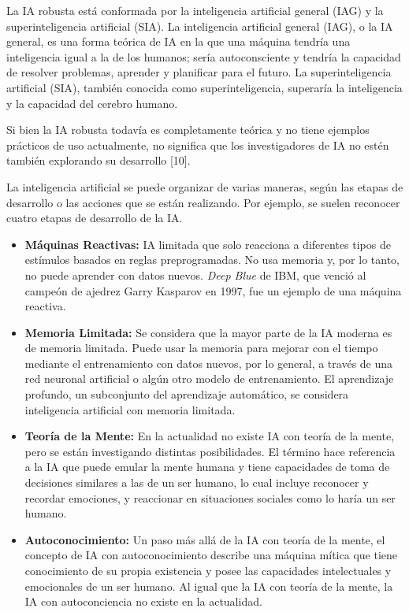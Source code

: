 La IA robusta está conformada por la inteligencia artificial general (IAG) y la superinteligencia artificial (SIA). La inteligencia artificial general (IAG), o la IA general, es una forma teórica de IA en la que una máquina tendría una inteligencia igual a la de los humanos; sería autoconsciente y tendría la capacidad de resolver problemas, aprender y planificar para el futuro. La superinteligencia artificial (SIA), también conocida como superinteligencia, superaría la inteligencia y la capacidad del cerebro humano.

Si bien la IA robusta todavía es completamente teórica y no tiene ejemplos prácticos de uso actualmente, no significa que los investigadores de IA no estén también explorando su desarrollo [10].

La inteligencia artificial se puede organizar de varias maneras, según las etapas de desarrollo o las acciones que se están realizando. Por ejemplo, se suelen reconocer cuatro etapas de desarrollo de la IA.


\begin{itemize}
  \item \textbf{Máquinas Reactivas:}  
  IA limitada que solo reacciona a diferentes tipos de estímulos basados en reglas preprogramadas. No usa memoria y, por lo tanto, no puede aprender con datos nuevos. \textit{Deep Blue} de IBM, que venció al campeón de ajedrez Garry Kasparov en 1997, fue un ejemplo de una máquina reactiva.

  \item \textbf{Memoria Limitada:}  
  Se considera que la mayor parte de la IA moderna es de memoria limitada. Puede usar la memoria para mejorar con el tiempo mediante el entrenamiento con datos nuevos, por lo general, a través de una red neuronal artificial o algún otro modelo de entrenamiento. El aprendizaje profundo, un subconjunto del aprendizaje automático, se considera inteligencia artificial con memoria limitada.

  \item \textbf{Teoría de la Mente:}  
  En la actualidad no existe IA con teoría de la mente, pero se están investigando distintas posibilidades. El término hace referencia a la IA que puede emular la mente humana y tiene capacidades de toma de decisiones similares a las de un ser humano, lo cual incluye reconocer y recordar emociones, y reaccionar en situaciones sociales como lo haría un ser humano.

  \item \textbf{Autoconocimiento:}  
  Un paso más allá de la IA con teoría de la mente, el concepto de IA con autoconocimiento describe una máquina mítica que tiene conocimiento de su propia existencia y posee las capacidades intelectuales y emocionales de un ser humano. Al igual que la IA con teoría de la mente, la IA con autoconciencia no existe en la actualidad.
\end{itemize}


